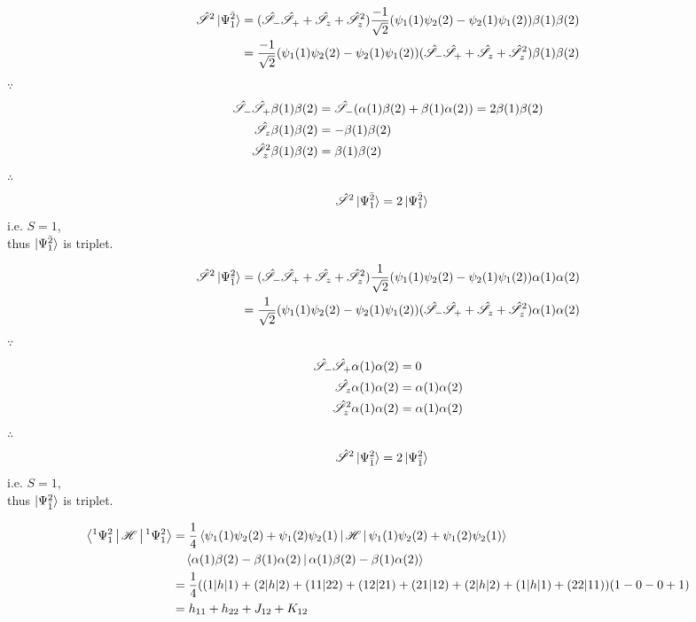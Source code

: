 \documentclass[a4paper]{article}
\begin{document}
\subex{$ \bullet $}
\begin{align}
\hat{\mathscr{S}}^2\ket{\Psi_1^{\bar{2}}} &= (\hat{\mathscr{S}}_-\hat{\mathscr{S}}_+ + \hat{\mathscr{S}}_z + \hat{\mathscr{S}}_z^2)\dfrac{-1}{\sqrt{2}}(\psi_1(1)\psi_2(2) - \psi_2(1)\psi_1(2))\beta(1)\beta(2) \notag\\
&= \dfrac{-1}{\sqrt{2}}(\psi_1(1)\psi_2(2) - \psi_2(1)\psi_1(2))(\hat{\mathscr{S}}_-\hat{\mathscr{S}}_+ + \hat{\mathscr{S}}_z + \hat{\mathscr{S}}_z^2)\beta(1)\beta(2)
\end{align}
$ \because $
\begin{align}
\hat{\mathscr{S}}_-\hat{\mathscr{S}}_+ \beta(1)\beta(2) &= \hat{\mathscr{S}}_-(\alpha(1)\beta(2) + \beta(1)\alpha(2)) = 2\beta(1)\beta(2) \\
\hat{\mathscr{S}}_z \beta(1)\beta(2) &= -\beta(1)\beta(2)\\
\hat{\mathscr{S}}_z^2 \beta(1)\beta(2) &= \beta(1)\beta(2)\\
\end{align}
$ \therefore $
\begin{align}
\hat{\mathscr{S}}^2\ket{\Psi_1^{\bar{2}}} &= 2\ket{\Psi_1^{\bar{2}}}
\end{align}
i.e. $ S=1 $,\\
thus $ \ket{\Psi_1^{\bar{2}}} $ is triplet.

\subex{$ \bullet $}
\begin{align}
\hat{\mathscr{S}}^2\ket{\Psi_{\bar{1}}^2} &= (\hat{\mathscr{S}}_-\hat{\mathscr{S}}_+ + \hat{\mathscr{S}}_z + \hat{\mathscr{S}}_z^2)\dfrac{1}{\sqrt{2}}(\psi_1(1)\psi_2(2) - \psi_2(1)\psi_1(2))\alpha(1)\alpha(2) \notag\\
&= \dfrac{1}{\sqrt{2}}(\psi_1(1)\psi_2(2) - \psi_2(1)\psi_1(2))(\hat{\mathscr{S}}_-\hat{\mathscr{S}}_+ + \hat{\mathscr{S}}_z + \hat{\mathscr{S}}_z^2)\alpha(1)\alpha(2)
\end{align}
$ \because $
\begin{align}
\hat{\mathscr{S}}_-\hat{\mathscr{S}}_+ \alpha(1)\alpha(2) &= 0 \\
\hat{\mathscr{S}}_z \alpha(1)\alpha(2) &= \alpha(1)\alpha(2)\\
\hat{\mathscr{S}}_z^2 \alpha(1)\alpha(2) &= \alpha(1)\alpha(2)\\
\end{align}
$ \therefore $
\begin{align}
\hat{\mathscr{S}}^2\ket{\Psi_{\bar{1}}^2} &= 2\ket{\Psi_{\bar{1}}^2}
\end{align}
i.e. $ S=1 $,\\
thus $ \ket{\Psi_{\bar{1}}^2} $ is triplet.

\subex{$ \bullet $}
\begin{align}
\Braket{^1\Psi_1^2 | \operatorname{\mathscr{H}} | ^1\Psi_1^2} &= \dfrac{1}{4} \Braket{\psi_1(1)\psi_2(2) + \psi_1(2)\psi_2(1) | \operatorname{\mathscr{H}} | \psi_1(1)\psi_2(2) + \psi_1(2)\psi_2(1)} \notag\\
  &\quad{} \Braket{\alpha(1)\beta(2) - \beta(1)\alpha(2) | \alpha(1)\beta(2) - \beta(1)\alpha(2)}\notag\\
&= \dfrac{1}{4}((1|h|1) + (2|h|2) + (11|22) + (12|21) + (21|12) + (2|h|2) + (1|h|1) + (22|11) ) (1 - 0 - 0 + 1) \notag\\
&= h_{11} + h_{22} + J_{12} + K_{12}
\end{align}
\end{document}
